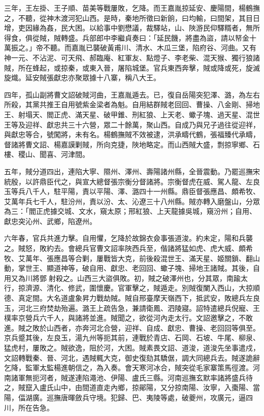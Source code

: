 \begin{pinyinscope}
三年，王左掛、王子順、苗美等戰屢敗，乞降。而王嘉胤掠延安、慶陽間，楊鶴撫之，不聽，從神木渡河犯山西。是時，秦地所徵曰新餉，曰均輸，曰間架，其目日增，吏因緣為姦，民大困。以給事中劉懋議，裁驛站，山、陜游民仰驛糈者，無所得食，俱從賊，賊轉盛。兵部郎中李繼貞奏曰：「延民饑，將盡為盜，請以帑金十萬振之。」帝不聽。而嘉胤已襲破黃甫川、清水、木瓜三堡，陷府谷、河曲。又有神一元、不沾泥、可天飛、郝臨庵、紅軍友、點燈子、李老柴、混天猴、獨行狼諸賊，所在蜂起，或掠秦，或東入晉，屠陷城堡。官兵東西奔擊，賊或降或死，旋滅旋熾。延安賊張獻忠亦聚眾據十八寨，稱八大王。

四年，孤山副將曹文詔破賊河曲，王嘉胤遁去。已，復自岳陽突犯澤、潞，為左右所殺，其黨共推王自用號紫金梁者為魁。自用結群賊老回回、曹操、八金剛、掃地王、射塌天、閻正虎、滿天星、破甲錐、刑紅狼、上天老、蠍子塊、過天星、混世王等及迎祥、獻忠共三十六營，眾二十餘萬，聚山西。自成乃與兄子過往從迎祥，與獻忠等合，號闖將，未有名。楊鶴撫賊不效被逮，洪承疇代鶴，張福臻代承疇，督諸將曹文詔、楊嘉謨剿賊，所向克捷，陜地略定。而山西賊大盛，剽掠寧鄉、石樓、稷山、聞喜、河津間。

五年，賊分道四出，連陷大寧、隰州、澤州、壽陽諸州縣，全晉震動。乃罷巡撫宋統殷，以許鼎臣代之，與宣大總督張宗衡分督諸將。宗衡督虎在威、駕人龍、左良玉等兵八千人，駐平陽，責以平陽、澤、潞四十一州縣。鼎臣督張應昌、頗希牧、艾萬年兵七千人，駐汾州，責以汾、太、沁遼三十八州縣。賊亦轉入磨盤山，分眾為三：「閻正虎據交城、文水，窺太原；邢紅狼、上天龍據吳城，窺汾州；自用、獻忠突沁州、武鄉，陷遼州。

六年春，官兵共進力擊。自用懼，乞降於故錦衣僉事張道浚。約未定，陽和兵襲之。賊怒，敗約去。會總兵官曹文詔率陜西兵至，偕諸將猛如虎、虎大威、頗希牧、艾萬年、張應昌等合剿，屢戰皆大克，前後殺混世王、滿天星、姬關鎖、翻山動，掌世王、顯道神等，破自用、獻忠、老回回、蠍子塊、掃地王諸賊。其後，自用又為川將鄧射殺之。山西三大盜俱敗。初，賊之破澤州也，分其眾，南踰太行，掠濟源、清化、修武，圍懷慶。官軍擊之，賊遁走。別賊復闌入西山，大掠順德、真定間。大名道盧象昇力戰劫賊。賊自邢臺摩天嶺西下，抵武安，敗總兵左良玉，河北三府焚劫殆遍。潞王上疏告急，兼請衛鳳、泗陵寢。詔特遣總兵倪寵、王樸率京營兵六千人，與諸將並進。賊聞之，欲從河內走太行。文詔邀擊之，不敢進。賊之敗於山西者，亦奔河北合營，迎祥、自成、獻忠、曹操、老回回等俱至。京兵蹙其後，左良玉，湯九州等扼其前，連戰於青店、石岡、石坡、牛尾、柳泉、猛虎村，屢敗之。賊欲逸，阻於河，大困。賊素畏文詔、道浚，道浚先坐事遣戍，文詔轉戰秦、晉、河北，遇賊輒大克，御史復劾其驕倨，調大同總兵去。賊遂詭辭乞降，監軍太監楊進朝信之，為入奏。會天寒河冰合，賊突從毛家寨策馬徑渡。河南諸軍無扼河者，賊遂連陷澠池、伊陽、盧氏三縣。河南巡撫玄默率諸將盛兵待之，賊竄入盧氏山中，由間道直走內鄉，掠鄖陽，又分掠南陽、汝寧，入棗陽、當陽，偪湖廣。巡撫唐暉斂兵守境。犯歸、巴、夷陵等處，破夔州，攻廣元，逼四川，所在告急。


\end{pinyinscope}
